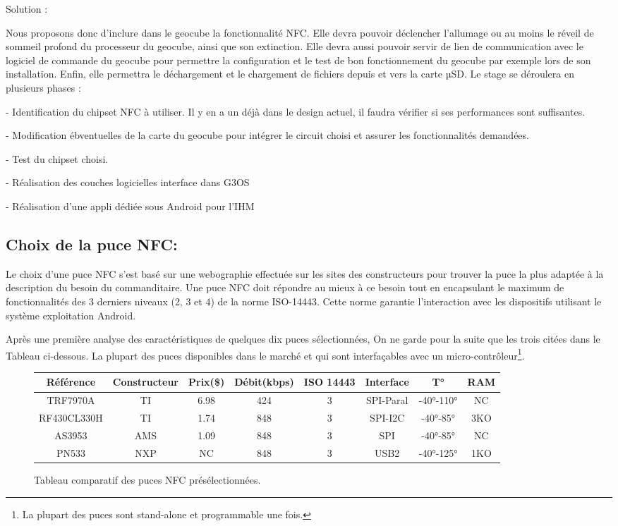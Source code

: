 \documentclass{themeensg}
\begin{document}
Solution :

Nous proposons donc d’inclure dans le geocube la fonctionnalité NFC. Elle devra pouvoir déclencher l’allumage ou au moins le réveil de sommeil profond du processeur du geocube, ainsi que son extinction. Elle devra aussi pouvoir servir de lien de communication avec le logiciel de commande du geocube pour permettre la configuration et le test de bon fonctionnement du geocube par exemple lors de son installation. Enfin, elle permettra le déchargement et le chargement de fichiers depuis et vers la carte µSD.
Le stage se déroulera en plusieurs phases :

- Identification du chipset NFC à utiliser. Il y en a un déjà dans le design actuel, il faudra vérifier si ses performances sont suffisantes.

- Modification ébventuelles de la carte du geocube pour intégrer le circuit choisi et assurer les fonctionnalités demandées.

- Test du chipset choisi.

- Réalisation des couches logicielles interface dans G3OS

- Réalisation d’une appli dédiée sous Android pour l’IHM


\subsection{Choix de la puce NFC:}
Le choix d'une puce NFC s'est basé sur une webographie effectuée sur les sites des constructeurs pour trouver la puce la plus adaptée à la description du besoin du commanditaire. Une puce NFC doit répondre au mieux à ce besoin tout en encapsulant le maximum de fonctionnalités des 3 derniers niveaux (2, 3 et 4) de la norme ISO-14443. Cette norme garantie l'interaction avec les dispositifs utilisant le système exploitation Android.

Après une première analyse des caractéristiques de quelques dix puces sélectionnées, On ne garde pour la suite que les trois citées dans le Tableau ci-dessous. La plupart des puces disponibles dans le marché et qui sont interfaçables avec un micro-contrôleur\footnote{La plupart des puces sont stand-alone et programmable une fois.}.
\begin{figure}
\begin{center}
\begin{tabular}{|c|c|c|c|c|c|c|c|}
\hline
Référence & Constructeur & Prix(\$) & Débit(kbps) & ISO 14443 & Interface & T° & RAM\\ \hline
TRF7970A & TI & 6.98 & 424 & 3 & SPI-Paral & -40°-110° & NC\\
RF430CL330H & TI & 1.74 & 848 & 3 & SPI-I2C & -40°-85° & 3KO\\
AS3953 & AMS & 1.09 & 848 & 3 & SPI & -40°-85° & NC\\
PN533 & NXP & NC & 848 & 3 & USB2 & -40°-125° & 1KO\\
\hline
\end{tabular}
\end{center}
\caption{Tableau comparatif des puces NFC présélectionnées.}
\end{figure}
\end{document}

